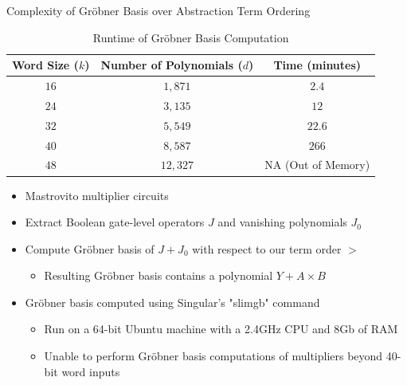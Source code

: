 \documentclass[xcolor=dvipsnames]{beamer}
\newcommand{\Grobner}{Gr\"{o}bner\xspace}
\begin{document}
\begin{frame}{\large{Complexity of \Grobner Basis over Abstraction Term Ordering}}
\begin{table}[t]
	\begin{center}
	    \caption{Runtime of Gr\"obner Basis Computation}\label{tab:sT}
	    \begin{tabular}{|c|c||c|} 
	        \hline
		{\bf Word Size ($k$)} & {\bf Number of Polynomials ($d$) } & {\bf Time (minutes) }  \\
		\hline
	        $16$	&  $1,871$  & $2.4$ \\
		\hline
		$24$	&  $3,135$  & $12$  \\
		\hline
	        $32$	&  $5,549$  & $22.6$ \\
		\hline
	        $40$	&  $8,587$  & $266$ \\
		\hline
		$48$	& $12,327$  & NA (Out of Memory) \\
	        \hline
	    \end{tabular}
	\end{center} 
\end{table}
\begin{itemize}
\item Mastrovito multiplier circuits
\item Extract Boolean gate-level operators $J$ and vanishing polynomials $J_0$
\item Compute Gr\"obner basis of $J + J_0$ with respect to our term order $>$
	\begin{itemize}
	\item Resulting Gr\"obner basis contains a polynomial $Y + A \times B$  
	\end{itemize}
\item Gr\"obner basis computed using Singular's "slimgb" command
	\begin{itemize}
	\item Run on a 64-bit Ubuntu machine with a 2.4GHz CPU and 8Gb of RAM
	\item Unable to perform Gr\"obner basis computations of multipliers beyond 40-bit word inputs
	\end{itemize}
\end{itemize}
\end{frame}

\end{document}
